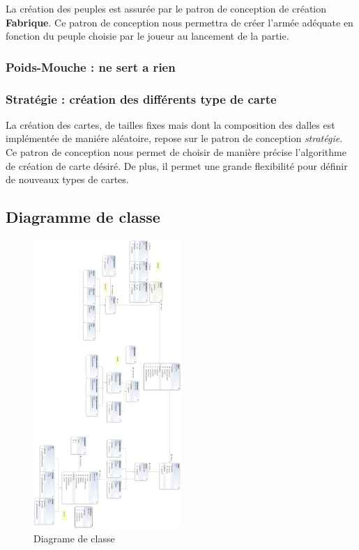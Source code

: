 		
		La création des peuples est assurée par le patron de conception de création \textbf{Fabrique}. Ce patron de conception nous permettra de créer l'armée adéquate en fonction du peuple choisie par le joueur au lancement de la partie. 
		\subsubsection{Poids-Mouche : ne sert a rien}

		\subsubsection{Stratégie : création des différents type de carte}



		La création des cartes, de tailles fixes mais dont la composition des dalles est implémentée de maniére aléatoire, repose sur le patron de conception \emph{stratégie}. Ce patron de conception nous permet de choisir de manière précise l'algorithme de création de carte désiré. De plus, il permet une grande flexibilité pour définir de nouveaux types de cartes.



	\subsection{Diagramme de classe}


	\begin{figure}
		\begin{center}
			\includegraphics[width=0.5\textwidth]{figure/entire_class_diagram}
		\end{center}
		\caption{Diagrame de classe}
		\label{fig:planif}
	\end{figure}




